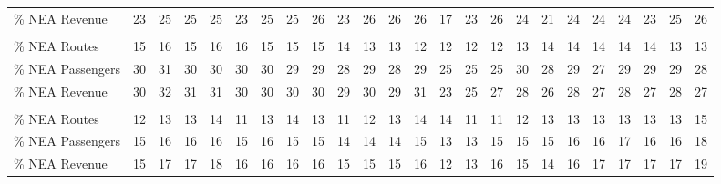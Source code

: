 \begin{tabular}[t]{llllllllllllllllllllllll}
\hspace{1em}\% NEA Revenue & 23 & 25 & 25 & 25 & 23 & 25 & 25 & 26 & 23 & 26 & 26 & 26 & 17 & 23 & 26 & 24 & 21 & 24 & 24 & 24 & 23 & 25 & 26\\
\addlinespace[0.3em]
\multicolumn{24}{l}{\textbf{United}}\\
\hspace{1em}\% NEA Routes & 15 & 16 & 15 & 16 & 16 & 15 & 15 & 15 & 14 & 13 & 13 & 12 & 12 & 12 & 12 & 13 & 14 & 14 & 14 & 14 & 14 & 13 & 13\\
\hspace{1em}\% NEA Passengers & 30 & 31 & 30 & 30 & 30 & 30 & 29 & 29 & 28 & 29 & 28 & 29 & 25 & 25 & 25 & 30 & 28 & 29 & 27 & 29 & 29 & 29 & 28\\
\hspace{1em}\% NEA Revenue & 30 & 32 & 31 & 31 & 30 & 30 & 30 & 30 & 29 & 30 & 29 & 31 & 23 & 25 & 27 & 28 & 26 & 28 & 27 & 28 & 27 & 28 & 27\\
\addlinespace[0.3em]
\multicolumn{24}{l}{\textbf{Spirit}}\\
\hspace{1em}\% NEA Routes & 12 & 13 & 13 & 14 & 11 & 13 & 14 & 13 & 11 & 12 & 13 & 14 & 14 & 11 & 11 & 12 & 13 & 13 & 13 & 13 & 13 & 13 & 15\\
\hspace{1em}\% NEA Passengers & 15 & 16 & 16 & 16 & 15 & 16 & 15 & 15 & 14 & 14 & 14 & 15 & 13 & 13 & 15 & 15 & 15 & 16 & 16 & 17 & 16 & 16 & 18\\
\hspace{1em}\% NEA Revenue & 15 & 17 & 17 & 18 & 16 & 16 & 16 & 16 & 15 & 15 & 15 & 16 & 12 & 13 & 16 & 15 & 14 & 16 & 17 & 17 & 17 & 17 & 19\\
\bottomrule
\end{tabular}

